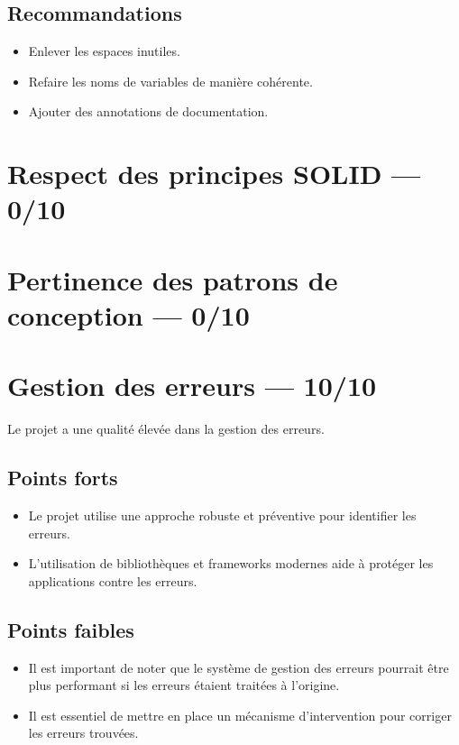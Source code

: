 \documentclass[11pt,a4paper]{article}
\begin{document}
\subsection*{Recommandations}
\begin{itemize}
  \item Enlever les espaces inutiles.
  \item Refaire les noms de variables de manière cohérente.
  \item Ajouter des annotations de documentation.
\end{itemize}

\section{Respect des principes SOLID — 0/10}
\section{Pertinence des patrons de conception — 0/10}
\section{Gestion des erreurs — 10/10}
Le projet a une qualité élevée dans la gestion des erreurs.

\subsection*{Points forts}
\begin{itemize}
  \item Le projet utilise une approche robuste et préventive pour identifier les erreurs.
  \item L'utilisation de bibliothèques et frameworks modernes aide à protéger les applications contre les erreurs.
\end{itemize}

\subsection*{Points faibles}
\begin{itemize}
  \item Il est important de noter que le système de gestion des erreurs pourrait être plus performant si les erreurs étaient traitées à l'origine.
  \item Il est essentiel de mettre en place un mécanisme d'intervention pour corriger les erreurs trouvées.
\end{itemize}
\end{document}
